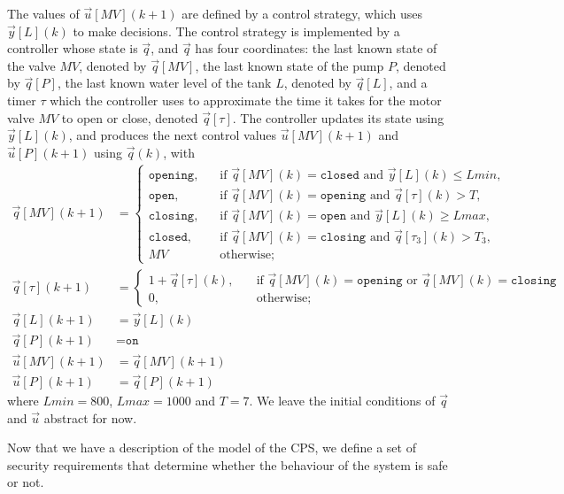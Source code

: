 The values of $\vec{u}[MV](k+1)$ are defined by a control strategy, which uses $\vec{y}[L](k)$ to make decisions. The control strategy is implemented by a controller whose state is $\vec{q}$, and $\vec{q}$ has four coordinates: the last known state of the valve $MV$, denoted by $\vec{q}[MV]$, the last known state of the pump $P$, denoted by $\vec{q}[P]$, the last known water level of the tank $L$, denoted by $\vec{q}[L]$,  and a timer $\tau$ which the controller uses to approximate the time it takes for the motor valve $MV$ to open or close, denoted $\vec{q}[\tau]$. 
The controller updates its state using $\vec{y}[L](k)$, and produces the next control values $\vec{u}[MV](k+1)$ and $\vec{u}[P](k+1)$ using $\vec{q}(k)$, with 
\begin{align}
  \label{eq:ControllerStage3}
  \vec{q}[MV](k+1)&=
  \begin{cases}
    \texttt{opening},&\quad \text{if $\vec{q}[MV](k)=\texttt{closed}$ and $\vec{y}[L](k)\leq Lmin$,}\\
    \texttt{open},&\quad \text{if $\vec{q}[MV](k)=\texttt{opening}$ and $\vec{q}[\tau](k)>T$,}\\
    \texttt{closing},&\quad \text{if $\vec{q}[MV](k)=\texttt{open}$ and $\vec{y}[L](k)\geq Lmax$,}\\
    \texttt{closed},&\quad \text{if $\vec{q}[MV](k)=\texttt{closing}$ and $\vec{q}[\tau_3](k) >T_3$,}\\
    MV&\quad \text{otherwise;}    
  \end{cases}\\
  \vec{q}[\tau](k+1)&=
\begin{cases}
  1+\vec{q}[\tau](k), &\quad \text{if $\vec{q}[MV](k)=\texttt{opening}$ or $\vec{q}[MV](k)=\texttt{closing}$}\\
  0,&\quad \text{otherwise;}    
\end{cases}\\
\vec{q}[L](k+1)&=\vec{y}[L](k)\\
\vec{q}[P](k+1)&=\texttt{on}\\
\vec{u}[MV](k+1)&=\vec{q}[MV](k+1)\\
\vec{u}[P](k+1)&=\vec{q}[P](k+1)
\end{align}
where $Lmin=800$, $Lmax=1000$ and $T=7$. We leave the initial conditions of $\vec{q}$ and $\vec{u}$ abstract for now.

Now that we have a description of the model of the CPS, we define a set of security requirements that determine whether the behaviour of the system is safe or not.

